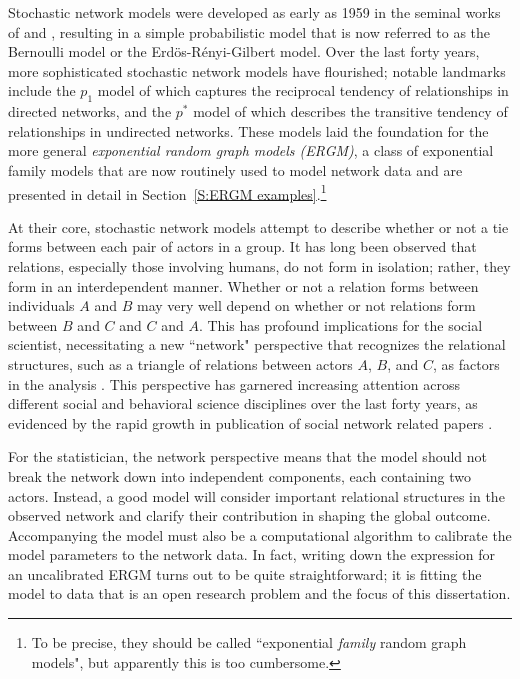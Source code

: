 Stochastic network models were developed as early as 1959 in the seminal works of 
\citet{Gilbert} and \citet{Erdos}, resulting in a simple probabilistic model that is 
now referred to as the Bernoulli model or the Erd\"{o}s-R\'{e}nyi-Gilbert model.  Over 
the last forty years, more sophisticated stochastic network models have flourished;  
notable landmarks include the $p_1$ model of \citet{Holland:1981} which captures the 
reciprocal tendency of relationships in directed networks, and the $p^*$ model of 
\citet{Frank:1986} which describes the transitive tendency of relationships in 
undirected networks.  These models laid the foundation for the more general 
\emph{exponential random graph models (ERGM)}, a class of exponential family 
models that are now routinely used to model network data and are presented in 
detail in Section~\ref{S:ERGM examples}.\footnote{To be precise, they should
be called ``exponential \emph{family} random graph models", but apparently
this is too cumbersome.} 

At their core, stochastic network models attempt to describe whether or not a tie 
forms between each pair of actors in a group.
It has long been observed that relations, especially those involving humans, do not 
form in isolation; rather, they form in an interdependent manner.  Whether or not a 
relation forms between individuals $A$ and $B$ may very well depend on whether or not 
relations form between $B$ and $C$ and $C$ and $A$.  This has profound implications 
for the social scientist, necessitating a new ``network" perspective that recognizes 
the relational structures, such as a triangle of relations between actors $A$, $B$, 
and $C$, as factors in the analysis \citep[Chapter 1]{Wasserman:1994}.  This perspective has 
garnered increasing attention across different social and behavioral science 
disciplines over the last forty years, as evidenced by the rapid growth in publication 
of social network related papers \citep[Chapter 1]{Knoke:2008}.
  
For the statistician, the network perspective means that the model should not break the 
network down into independent components, each containing two actors.
Instead, a good model will consider important relational structures in the observed network 
and clarify their contribution in shaping the global outcome.   
Accompanying the model must also be a computational algorithm to calibrate the model 
parameters to the network data.  
In fact, writing down the expression for an uncalibrated ERGM turns out to be quite
straightforward; it is fitting the model
to data that is an open research problem and the focus of this dissertation.

